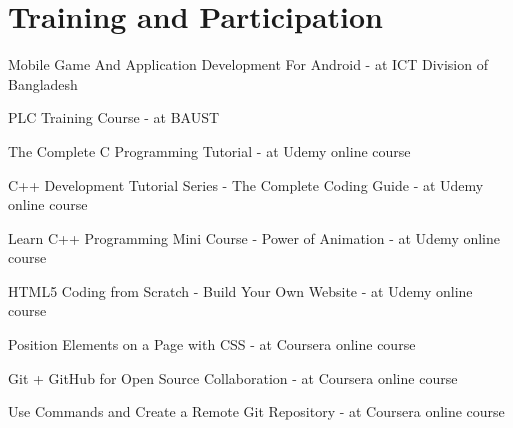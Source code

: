 \documentclass[a4paper,20pt]{article}
\begin{document}
\section{Training and Participation}
\begin{description}[font=$\bullet$]
\item {Mobile Game And Application Development For Android - at ICT Division of Bangladesh}
\vspace{-5pt}
\item {PLC Training Course - at BAUST}
\vspace{-5pt}
\item {The Complete C Programming Tutorial - at Udemy online course}
\vspace{-5pt}
\item {C++ Development Tutorial Series - The Complete Coding Guide - at Udemy online course }
\vspace{-5pt}
\item {Learn C++ Programming Mini Course - Power of Animation - at Udemy online course}
\vspace{-5pt}
\item {HTML5 Coding from Scratch - Build Your Own Website - at Udemy online course}
\vspace{-5pt}
\item {Position Elements on a Page with CSS - at Coursera online course }
\vspace{-5pt}
\item {Git + GitHub for Open Source Collaboration - at Coursera online course}
\vspace{-5pt}
\item {Use Commands and Create a Remote Git Repository - at Coursera online course}

\end{description}

\vspace{5pt}

\begin{comment}
\section{Honors and Awards}
\begin{description}[font=$\bullet$]
\item {Awarded title of Intel Software Innovator - May, 2019}
\vspace{10pt}
\item {Second Runner's Up at TCS EngiNx Engineering Project Innovation Content - September, 2018 }
\vspace{-5pt}
\item {Runner's Up at Facebook Developers Circle Hackathon - August, 2017}

\end{description}

\vspace{5pt}
\end{comment}
\end{document}
